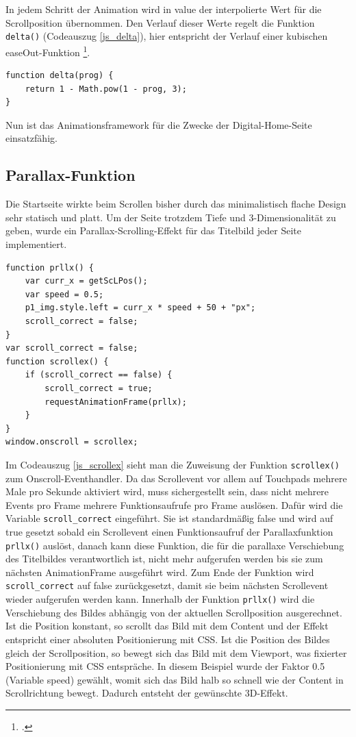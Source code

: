 In jedem Schritt der Animation wird in value der interpolierte Wert für die Scrollposition übernommen. Den Verlauf dieser Werte regelt die Funktion \lstinline{delta()} (Codeauszug \ref{js_delta}), hier entspricht der Verlauf einer kubischen easeOut-Funktion \footcite[vgl.][]{easeOut}.



\begin{lstlisting}[caption=Die Funktion delta., label=js_delta]
function delta(prog) {
	return 1 - Math.pow(1 - prog, 3);
}
\end{lstlisting}

Nun ist das Animationsframework für die Zwecke der Digital-Home-Seite einsatzfähig.

\subsection{Parallax-Funktion}
Die Startseite wirkte beim Scrollen bisher durch das minimalistisch flache Design sehr statisch und platt. Um der Seite trotzdem Tiefe und 3-Dimensionalität zu geben, wurde ein Parallax-Scrolling-Effekt für das Titelbild jeder Seite implementiert.

\begin{lstlisting}[caption=Das Onscroll-Event und die Parallax-Callbackfunktion., label=js_scrollex]
function prllx() {
	var curr_x = getScLPos();
	var speed = 0.5;
	p1_img.style.left = curr_x * speed + 50 + "px";
	scroll_correct = false;
}
var scroll_correct = false;
function scrollex() {
	if (scroll_correct == false) {
		scroll_correct = true;
		requestAnimationFrame(prllx);
	}
}
window.onscroll = scrollex;
\end{lstlisting}

Im Codeauszug \ref{js_scrollex} sieht man die Zuweisung der Funktion \lstinline{scrollex()} zum Onscroll-Eventhandler. Da das Scrollevent vor allem auf Touchpads mehrere Male pro Sekunde aktiviert wird, muss sichergestellt sein, dass nicht mehrere Events pro Frame mehrere Funktionsaufrufe pro Frame auslösen. Dafür wird die Variable \lstinline{scroll_correct} eingeführt. Sie ist standardmäßig false und wird auf true gesetzt sobald ein Scrollevent einen Funktionsaufruf der Parallaxfunktion \lstinline{prllx()} auslöst, danach kann diese Funktion, die für die parallaxe Verschiebung des Titelbildes verantwortlich ist, nicht mehr aufgerufen werden bis sie zum nächsten AnimationFrame ausgeführt wird. Zum Ende der Funktion wird \lstinline{scroll_correct} auf false zurückgesetzt, damit sie beim nächsten Scrollevent wieder aufgerufen werden kann. Innerhalb der Funktion \lstinline{prllx()} wird die Verschiebung des Bildes abhängig von der aktuellen Scrollposition ausgerechnet. Ist die Position konstant, so scrollt das Bild mit dem Content und der Effekt entspricht einer absoluten Positionierung mit CSS. Ist die Position des Bildes gleich der Scrollposition, so bewegt sich das Bild mit dem Viewport, was fixierter Positionierung mit CSS entspräche. In diesem Beispiel wurde der Faktor 0.5 (Variable speed) gewählt, womit sich das Bild halb so schnell wie der Content in Scrollrichtung bewegt. Dadurch entsteht der gewünschte 3D-Effekt.




